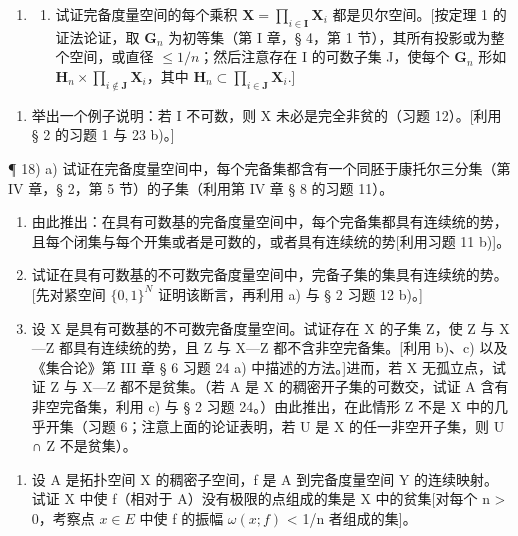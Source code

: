 \begin{enumerate}
\def\labelenumi{\arabic{enumi})}
\setcounter{enumi}{16}
\tightlist
\item
  \begin{enumerate}
  \def\labelenumii{\alph{enumii})}
  \tightlist
  \item
    试证完备度量空间的每个乘积 \(\mathbf{X} = \prod_{i\in \mathbf{I}}\mathbf{X}_i\) 都是贝尔空间。{[}按定理 1 的证法论证，取 \(\mathbf{G}_n\) 为初等集（第 I 章，§ 4，第 1 节），其所有投影或为整个空间，或直径 \(\leqslant 1 / n\)；然后注意存在 I 的可数子集 J，使每个 \(\mathbf{G}_n\) 形如 \(\mathbf{H}_n\times \prod_{i\notin \mathbf{J}}\mathbf{X}_i\)，其中 \(\mathbf{H}_n\subset \prod_{i\in \mathbf{J}}\mathbf{X}_i.\){]}
  \end{enumerate}
\end{enumerate}

\begin{enumerate}
\def\labelenumi{\alph{enumi})}
\setcounter{enumi}{1}
\tightlist
\item
  举出一个例子说明：若 I 不可数，则 X 未必是完全非贫的（习题 12）。{[}利用 § 2 的习题 1 与 23 b)。{]}
\end{enumerate}

¶ 18) a) 试证在完备度量空间中，每个完备集都含有一个同胚于康托尔三分集（第 IV 章，§ 2，第 5 节）的子集（利用第 IV 章 § 8 的习题 11）。

\begin{enumerate}
\def\labelenumi{\alph{enumi})}
\setcounter{enumi}{1}
\item
  由此推出：在具有可数基的完备度量空间中，每个完备集都具有连续统的势，且每个闭集与每个开集或者是可数的，或者具有连续统的势{[}利用习题 11 b){]}。
\item
  试证在具有可数基的不可数完备度量空间中，完备子集的集具有连续统的势。{[}先对紧空间 \(\{0, 1\}^{N}\) 证明该断言，再利用 a) 与 § 2 习题 12 b)。{]}
\item
  设 X 是具有可数基的不可数完备度量空间。试证存在 X 的子集 Z，使 Z 与 X---Z 都具有连续统的势，且 Z 与 X---Z 都不含非空完备集。{[}利用 b)、c) 以及《集合论》第 III 章 § 6 习题 24 a) 中描述的方法。{]}进而，若 X 无孤立点，试证 Z 与 X---Z 都不是贫集。（若 A 是 X 的稠密开子集的可数交，试证 A 含有非空完备集，利用 c) 与 § 2 习题 24。）由此推出，在此情形 Z 不是 X 中的几乎开集（习题 6；注意上面的论证表明，若 U 是 X 的任一非空开子集，则 U ∩ Z 不是贫集）。
\end{enumerate}

\begin{enumerate}
\def\labelenumi{\arabic{enumi})}
\setcounter{enumi}{18}
\tightlist
\item
  设 A 是拓扑空间 X 的稠密子空间，f 是 A 到完备度量空间 Y 的连续映射。试证 X 中使 f（相对于 A）没有极限的点组成的集是 X 中的贫集{[}对每个 n \textgreater{} 0，考察点 \(x \in E\) 中使 f 的振幅 \(\omega(x; f)\) \textless{} 1/n 者组成的集{]}。
\end{enumerate}

